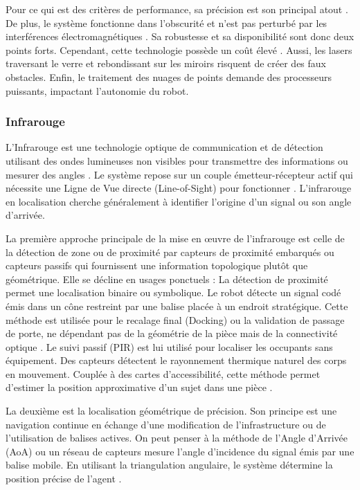 \documentclass[11pt, a4paper]{article}
\begin{document}
Pour ce qui est des critères de performance, sa précision est son principal atout \cite{sesyukSurvey3DIndoor2022}. De plus, le système fonctionne dans l’obscurité et n’est pas perturbé par les interférences électromagnétiques \cite{retscherIndoorNavigationUser2022}. Sa robustesse et sa disponibilité sont donc deux points forts. Cependant, cette technologie possède un coût élevé \cite{obeidatReviewIndoorLocalization2021}. Aussi, les lasers traversant le verre et rebondissant sur les miroirs risquent de créer des faux obstacles. Enfin, le traitement des nuages de points demande des processeurs puissants, impactant l'autonomie du robot.

\subsubsection{Infrarouge}

L’Infrarouge est une technologie optique de communication et de détection utilisant des ondes lumineuses non visibles pour transmettre des informations ou mesurer des angles \cite{obeidatReviewIndoorLocalization2021}. Le système repose sur un couple émetteur-récepteur actif qui nécessite une Ligne de Vue directe (Line-of-Sight) pour fonctionner \cite{huangIndoorPositioningSystems2023}. L’infrarouge en localisation cherche généralement à identifier l’origine d’un signal ou son angle d’arrivée.

La première approche principale de la mise en œuvre  de l’infrarouge est celle de la détection de zone ou de proximité par capteurs de proximité embarqués ou capteurs passifs qui fournissent une information topologique plutôt que géométrique. Elle se décline en usages ponctuels : La détection de proximité permet une localisation binaire ou symbolique. Le robot détecte un signal codé émis dans un cône restreint par une balise placée à un endroit stratégique. Cette méthode est utilisée pour le recalage final (Docking) ou la validation de passage de porte, ne dépendant pas de la géométrie de la pièce mais de la connectivité optique \cite{huangIndoorPositioningSystems2023}. Le suivi passif (PIR) est lui utilisé pour localiser les occupants sans équipement. Des capteurs détectent le rayonnement thermique naturel des corps en mouvement. Couplée à des cartes d'accessibilité, cette méthode permet d'estimer la position approximative d'un sujet dans une pièce \cite{retscherIndoorNavigationUser2022}.

La deuxième est la localisation géométrique de précision. Son principe est une navigation continue en échange d’une modification de l’infrastructure ou de l’utilisation de balises actives. On peut penser à la méthode de l’Angle d’Arrivée (AoA) ou un réseau de capteurs mesure l’angle d’incidence du signal émis par une balise mobile. En utilisant la triangulation angulaire, le système détermine la position précise de l’agent \cite{obeidatReviewIndoorLocalization2021}.
\end{document}
